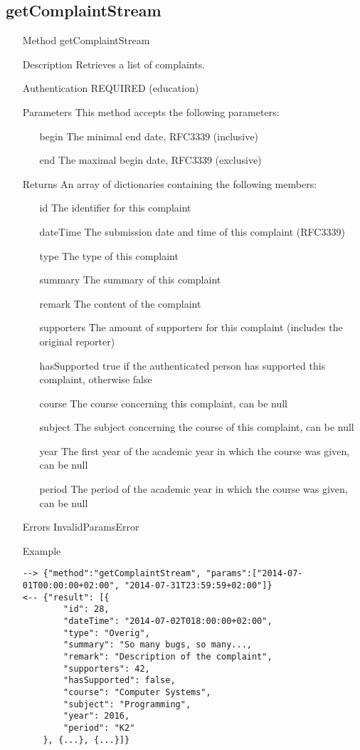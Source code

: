 \documentclass[a4paper]{scrreprt}
\begin{document}
\subsection{getComplaintStream}
\begin{enumerate}
\item[Method] getComplaintStream
\item[Description] Retrieves a list of complaints.
\item[Authentication] REQUIRED (education)
\item[Parameters] This method accepts the following parameters:
\begin{enumerate}
	\item[begin] The minimal end date, RFC3339 (inclusive)
    \item[end] The maximal begin date, RFC3339 (exclusive)
    \end{enumerate}
\item[Returns] An array of dictionaries containing the following members:
\begin{enumerate}
    \item[id] The identifier for this complaint
    \item[dateTime] The submission date and time of this complaint (RFC3339)
    \item[type] The type of this complaint
    \item[summary] The summary of this complaint
    \item[remark] The content of the complaint
    \item[supporters] The amount of supporters for this complaint (includes the original reporter)
    \item[hasSupported] true if the authenticated person has supported this complaint, otherwise false
    \item[course] The course concerning this complaint, can be null
    \item[subject] The subject concerning the course of this complaint, can be null
    \item[year] The first year of the academic year in which the course was given, can be null
    \item[period] The period of the academic year in which the course was given, can be null
	\end{enumerate}
\item[Errors] InvalidParamsError
\item[Example]
\begin{lstlisting}
--> {"method":"getComplaintStream", "params":["2014-07-01T00:00:00+02:00", "2014-07-31T23:59:59+02:00"]}
<-- {"result": [{
        "id": 28,
        "dateTime": "2014-07-02T018:00:00+02:00",
        "type": "Overig",
        "summary": "So many bugs, so many...,
        "remark": "Description of the complaint",
        "supporters": 42,
        "hasSupported": false,
        "course": "Computer Systems",
        "subject": "Programming",
        "year": 2016,
        "period": "K2"
    }, {...}, {...}]}
\end{lstlisting}
\end{enumerate}
\end{document}
